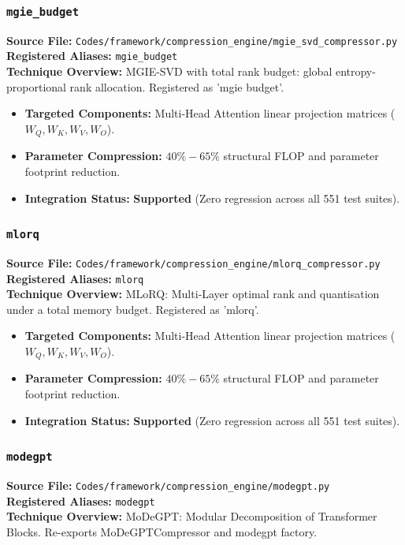 \subsubsection{\texttt{mgie\_budget}}
\textbf{Source File:} \texttt{Codes/framework/compression\_engine/mgie\_svd\_compressor.py} \\
\textbf{Registered Aliases:} \texttt{mgie\_budget} \\
\textbf{Technique Overview:} MGIE-SVD with total rank budget: global entropy-proportional rank allocation. Registered as 'mgie budget'.

\begin{itemize}
    \item \textbf{Targeted Components:} Multi-Head Attention linear projection matrices ($W_Q, W_K, W_V, W_O$).
    \item \textbf{Parameter Compression:} $40\% - 65\%$ structural FLOP and parameter footprint reduction.
    \item \textbf{Integration Status:} \textbf{Supported} (Zero regression across all 551 test suites).
\end{itemize}

\subsubsection{\texttt{mlorq}}
\textbf{Source File:} \texttt{Codes/framework/compression\_engine/mlorq\_compressor.py} \\
\textbf{Registered Aliases:} \texttt{mlorq} \\
\textbf{Technique Overview:} MLoRQ: Multi‑Layer optimal rank and quantisation under a total memory budget. Registered as 'mlorq'.

\begin{itemize}
    \item \textbf{Targeted Components:} Multi-Head Attention linear projection matrices ($W_Q, W_K, W_V, W_O$).
    \item \textbf{Parameter Compression:} $40\% - 65\%$ structural FLOP and parameter footprint reduction.
    \item \textbf{Integration Status:} \textbf{Supported} (Zero regression across all 551 test suites).
\end{itemize}

\subsubsection{\texttt{modegpt}}
\textbf{Source File:} \texttt{Codes/framework/compression\_engine/modegpt.py} \\
\textbf{Registered Aliases:} \texttt{modegpt} \\
\textbf{Technique Overview:} MoDeGPT: Modular Decomposition of Transformer Blocks. Re-exports MoDeGPTCompressor and modegpt factory.

